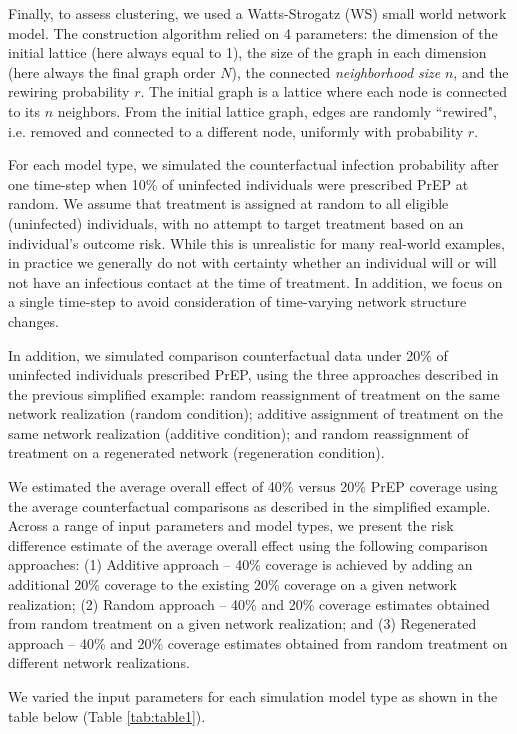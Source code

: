 \documentclass{article}
\theoremstyle{definition}
\begin{document}
Finally, to assess clustering, we used a Watts-Strogatz (WS) small world network model. The construction algorithm relied on 4 parameters: the dimension of the initial lattice (here always equal to 1), the size of the graph in each dimension (here always the final graph order $N$), the connected \textit{neighborhood size} $n$, and the rewiring probability $r$. The initial graph is a lattice where each node is connected to its $n$ neighbors. From the initial lattice graph, edges are randomly ``rewired", i.e. removed and connected to a different node, uniformly with probability $r$.

For each model type, we simulated the counterfactual infection probability after one time-step when 10\% of uninfected individuals were prescribed PrEP at random. We assume that treatment is assigned at random to all eligible (uninfected) individuals, with no attempt to target treatment based on an individual's outcome risk. While this is unrealistic for many real-world examples, in practice we generally do not with certainty whether an individual will or will not have an infectious contact at the time of treatment. In addition, we focus on a single time-step to avoid consideration of time-varying network structure changes.

In addition, we simulated comparison counterfactual data under 20\% of uninfected individuals prescribed PrEP, using the three approaches described in the previous simplified example: random reassignment of treatment on the same network realization (random condition); additive assignment of treatment on the same network realization (additive condition); and random reassignment of treatment on a regenerated network (regeneration condition). 

We estimated the average overall effect of 40\% versus 20\% PrEP coverage using the average counterfactual comparisons as described in the simplified example. Across a range of input parameters and model types, we present the risk difference estimate of the average overall effect using the following comparison approaches: (1) Additive approach -- 40\% coverage is achieved by adding an additional 20\% coverage to the existing 20\% coverage on a given network realization; (2) Random approach -- 40\% and 20\% coverage estimates obtained from random treatment on a given network realization; and (3) Regenerated approach -- 40\% and 20\% coverage estimates obtained from random treatment on different network realizations.

We varied the input parameters for each simulation model type as shown in the table below (Table \ref{tab:table1}).
\end{document}
